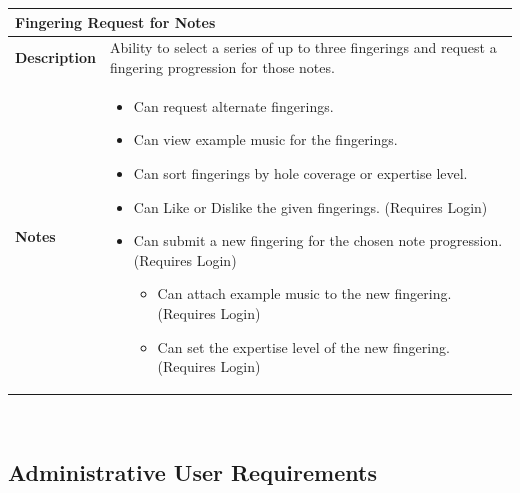 \documentclass[12pt,english]{article}
\providecommand{\tabularnewline}{\\}
\begin{document}
\begin{tabular}{|p{3cm}|p{13cm}|}
\hline 
\multicolumn{2}{|l|}{\textbf{Fingering Request for Notes}}\tabularnewline
\hline 
\textbf{Description}  & Ability to select a series of up to three fingerings and request a
fingering progression for those notes. \tabularnewline
\hline 
\textbf{Notes}  & \begin{itemize}
\item Can request alternate fingerings. 
\item Can view example music for the fingerings. 
\item Can sort fingerings by hole coverage or expertise level. 
\item Can \textquotedbl{}Like\textquotedbl{} or \textquotedbl{}Dislike\textquotedbl{}
the given fingerings. (Requires Login) 
\item Can submit a new fingering for the chosen note progression. (Requires
Login) 

\begin{itemize}
\item Can attach example music to the new fingering. (Requires Login) 
\item Can set the expertise level of the new fingering. (Requires Login) \end{itemize}
\end{itemize}
\tabularnewline
\hline 
\end{tabular}\\[0.5cm]


\subsection{Administrative User Requirements}
\end{document}
